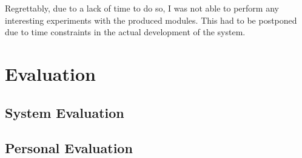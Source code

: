 \documentclass[report.tex]{subfiles}
\begin{document}
Regrettably, due to a lack of time to do so, I was not able to perform any
interesting experiments with the produced modules. This had to be postponed
due to time constraints in the actual development of the system.

\section{Evaluation} %
\label{sec:evaluation}
\subsection{System Evaluation} %
\label{sub:system_evaluation}


\subsection{Personal Evaluation} %
\label{sub:personal_evaluation}


\newpage
\end{document}

